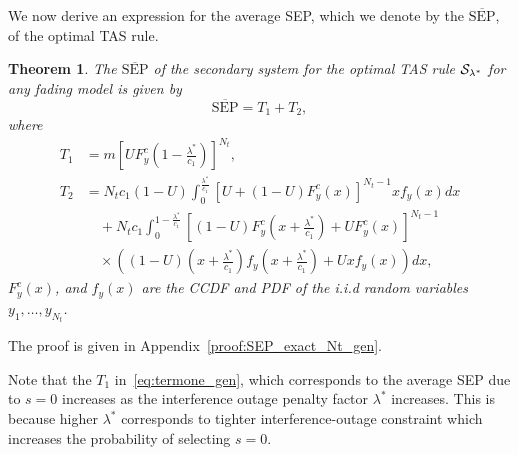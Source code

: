 \documentclass[12pt,draftcls,peerreview,onecolumn]{IEEEtran}
\newtheorem{theorem}{{\bf Theorem}}
\newcommand{\SEP}{\text{SEP}}
\newcommand{\nx}{{0}}
\newcommand{\lam}{\lambda}
\newcommand{\lamstar}{\lam^{*}}
\newcommand{\termone}{T_1}
\newcommand{\termtwo}{T_2}
\newcommand{\Nt}{{N_t}}
\newcommand{\Nr}{{N_r}}
\newcommand{\cone}{c_{1}}
\newcommand{\ctwo}{c_{2}}
\newcommand{\m}{\cone}
\newcommand{\lambym}{\frac{\lam}{\m}}
\newcommand{\lamstarbym}{\frac{\lamstar}{\m}}
\newcommand{\yk}[1]{y_{#1}}
\newcommand{\al}{\ctwo}
\newcommand{\snr}{\Omega}
\newcommand{\albysnr}[1][]{\frac{\al#1}{\snr}}
\newcommand{\un}{U}
\newcommand{\callamstarrule}{\cal S_{\lam^{*}}}
\newcommand{\avgSEP}{\overline{\SEP}}
\newcommand{\unccdfy}[2]{\frac{{#1}\,\,\gamma\left(\Nr,-\albysnr\ln{#2}\right)}{\Gamma\left(Nr\right)}}
\newcommand{\ytimespdfyNr}{\left(\ln\left(\frac{1}{x}\right)\right)^{\Nr-1}x^{\albysnr[]}} %
\newcommand{\ypluslamtimespdfyNr}{\left(\ln\left(\frac{1}{x+\lambym}\right)\right)^{\Nr-1}\left(x+\lambym\right)^{\albysnr[]}} %
\newcommand{\pdfyNrgen}[1]{f_{y}\left(#1\right)} %
\newcommand{\ccdfy}[1]{F^{c}_{y}\left(#1 \right)}
\newcommand{\unccdfygen}[2]{{#1} \ccdfy{#2}  }
\begin{document}
We now derive an expression for the average SEP, which we denote by the $\avgSEP$, of the optimal TAS rule. 
\begin{theorem}
\label{thm:SEP_exact_Nt_gen}
The $\avgSEP$ of the secondary system for the optimal TAS rule $\callamstarrule$ for any fading model is given by
\begin{equation}
\label{eq:SEP_MPSK_Nt_gen} 
\avgSEP= \termone + \termtwo,
\end{equation}
%
where
\begin{align}
\label{eq:termone_gen} 
\termone &=m\left[\unccdfygen{\un}{1-\lamstarbym}\right]^{\Nt},\\
\label{eq:termtwo_gen}
\termtwo \!&= \Nt\m(1-\un)\int_{0}^{\lamstarbym} \left[\un + \unccdfygen{(1-\un)}{x}\right]^{\Nt-1} x\pdfyNrgen{x} dx\nonumber\\
&\quad + \Nt\m \int_{0}^{1-\lamstarbym}
\left[\unccdfygen{(1-\un)}{x+\lamstarbym} + \unccdfygen{\un}{x}\right]^{\Nt-1}\nonumber\\
&\quad\times\left((1-\un)\left(x + \lamstarbym\right) \pdfyNrgen{x + \lamstarbym}+\un x\pdfyNrgen{x}\right) dx ,
\end{align}
%
$\ccdfy{x}$, and $\pdfyNrgen{x}$ are the CCDF and PDF of the i.i.d random variables  $\yk{1},\ldots,\yk{\Nt}$.
\end{theorem}
%
\begin{IEEEproof}
The proof is given in Appendix~\ref{proof:SEP_exact_Nt_gen}.
\end{IEEEproof}
%
Note that the $\termone$ in~\eqref{eq:termone_gen}, which corresponds to the average SEP due to $s=\nx$ increases as the interference outage penalty factor $\lamstar$ increases. This is because higher $\lamstar$ corresponds to tighter interference-outage constraint which increases the probability of selecting $s=\nx$. 
%
\end{document}
